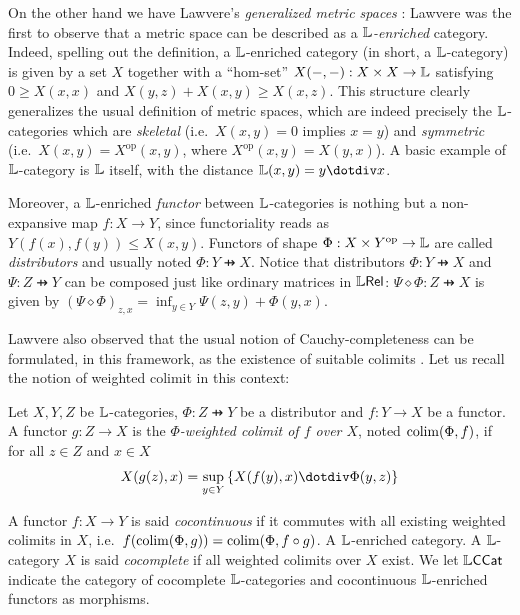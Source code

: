 On the other hand we have Lawvere's \emph{generalized metric spaces}  \cite{Lawvere1973, Hofmann2014, Stubbe2014}:
Lawvere was the first to observe that a metric space can be described as a \emph{$\mathbb{L}$-enriched} category. Indeed, spelling out the definition, a $\mathbb{L}$-enriched category (in short, a $\mathbb{L}$-category) is given by a set $X$ together with a ``hom-set'' $X(-,-):X\times X\to \mathbb{L}$ satisfying 
$0  \geq X(x,x)$ and $X(y,z)+X(x,y)\geq  X(x,z)$. 
This structure clearly generalizes the usual definition of metric spaces, which are indeed precisely the  
$\mathbb{L}$-categories which are \emph{skeletal} (i.e.~$X(x,y)=0$ implies $x=y$) and \emph{symmetric} (i.e.~$X(x,y)=X^{\mathrm{op}}(x,y)$, where $X^{\mathrm{op}}(x,y)=X(y,x)$).
A basic example of $\mathbb{L}$-category is $\mathbb{L}$ itself, with the distance $\Lawv(x,y)=y \menus x$. 

Moreover, a $\mathbb{L}$-enriched \emph{functor} between $\mathbb{L}$-categories is nothing but a non-expansive map $f:X\to Y$, since functoriality reads as $Y(f(x),f(y))\leq X(x,y)$.
Functors of shape $\Phi: X\times Y^{\mathrm{op}}\to \mathbb{L}$ are called \emph{distributors} and usually noted $\Phi: Y \pfun X$. Notice that distributors $\Phi: Y\pfun X$ and $\Psi: Z\pfun Y$ can be composed just like 
ordinary matrices in $\mathbb{L} \mathsf{Rel}$: $\Psi\diamond \Phi : Z\pfun X$ is given by
$(\Psi\diamond \Phi)_{z,x}=\inf_{y\in Y}\Psi(z,y)+\Phi(y,x)$. 


Lawvere also observed that the usual notion of Cauchy-completeness can be formulated, in this framework, as the existence of suitable colimits \cite{Lawvere1973}. Let us recall the notion of weighted colimit in this context:
 
\begin{definition}
Let $X,Y,Z$ be $\mathbb{L}$-categories,
$\Phi: Z\pfun Y$ be a distributor and  $f:Y\to X$ be a functor.
A functor $g:Z\to X$ is the \emph{$\Phi$-weighted colimit of $f$ over $X$}, noted $\mathrm{colim}(\Phi,f)$, if for all $z\in Z$ and $x\in X$
\begin{align}
X(g(z),x)= \sup_{y\in Y}\left\{X(f(y),x)\menus \Phi(y,z)\right\}
\end{align} 

\end{definition}


A functor $f:X\to Y$ is said \emph{cocontinuous} if it commutes with all existing weighted colimits in $X$, i.e.~$f(\mathrm{colim}(\Phi,g))=\mathrm{colim}(\Phi,f\circ g)$. A $\mathbb{L}$-enriched category.
A $\mathbb{L}$-category $X$ is said \emph{cocomplete} if all weighted colimits over $X$ exist. 
We let $\mathbb{L}\mathsf{CCat}$ indicate the category of cocomplete $\mathbb{L}$-categories and cocontinuous $\mathbb{L}$-enriched functors as morphisms. 


